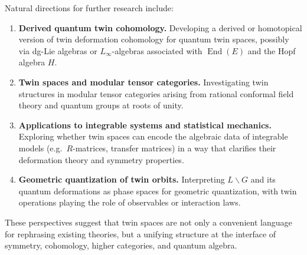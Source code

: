 \documentclass[11pt,a4paper]{article}
\numberwithin{equation}{section}
\DeclareMathOperator{\End}{End}
\newcommand{\LinearSubgroup}{L}
\begin{document}
	Natural directions for further research include:
	\begin{enumerate}[label=(\alph*)]
		\item \textbf{Derived quantum twin cohomology.}
		Developing a derived or homotopical version of twin deformation cohomology for quantum twin spaces,
		possibly via dg-Lie algebras or $L_\infty$-algebras associated with $\End(E)$ and the Hopf algebra $H$.
		\item \textbf{Twin spaces and modular tensor categories.}
		Investigating twin structures in modular tensor categories arising from rational conformal field theory 
		and quantum groups at roots of unity.
		\item \textbf{Applications to integrable systems and statistical mechanics.}
		Exploring whether twin spaces can encode the algebraic data of integrable models (e.g.\ $R$-matrices, 
		transfer matrices) in a way that clarifies their deformation theory and symmetry properties.
		\item \textbf{Geometric quantization of twin orbits.}
		Interpreting $\LinearSubgroup\backslash G$ and its quantum deformations as phase spaces for geometric quantization,
		with twin operations playing the role of observables or interaction laws.
	\end{enumerate}
	
	These perspectives suggest that twin spaces are not only a convenient language for rephrasing existing theories,
	but a unifying structure at the interface of symmetry, cohomology, higher categories, and quantum algebra.
	
\end{document}
